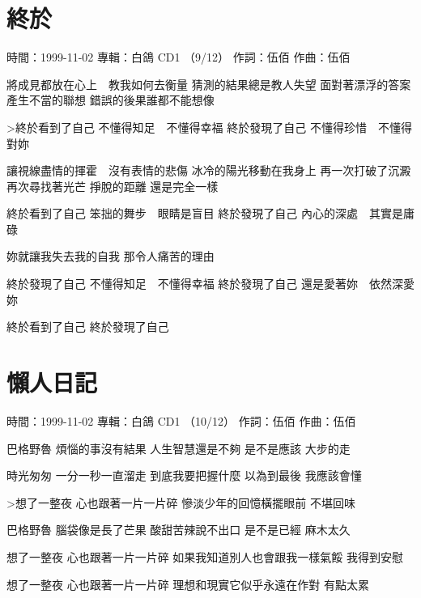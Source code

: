 \documentclass[UTF8,a4paper,oneside,twocolumn,12pt]{ctexbook}
\newcommand{\infopair}[2]{\textbullet #1：#2}
\newcommand{\zc}[1][伍佰]{\infopair{作詞}{#1}}
\newcommand{\zq}[1][伍佰]{\infopair{作曲}{#1}}
\newcommand{\zj}[1]{\infopair{專輯}{#1}}
\newcommand{\sj}[1]{\infopair{時間}{#1}}
\newenvironment{info}{\begin{flushleft}\kaishu
	}
	{\end{flushleft}\normalsize\yahei\par}
\newenvironment{lyric}{
	}
{}
\begin{document}
\section{終於}
\begin{info}
	\sj{1999-11-02}
	\zj{白鴿 CD1 （9/12）}
	\zc
	\zq
\end{info}
\begin{lyric}
	將成見都放在心上　教我如何去衡量
	猜測的結果總是教人失望
	面對著漂浮的答案　產生不當的聯想
	錯誤的後果誰都不能想像

	>終於看到了自己
	不懂得知足　不懂得幸福
	終於發現了自己
	不懂得珍惜　不懂得對妳

	讓視線盡情的揮霍　沒有表情的悲傷
	冰冷的陽光移動在我身上
	再一次打破了沉澱　再次尋找著光芒
	掙脫的距離  還是完全一樣

	終於看到了自己
	笨拙的舞步　眼睛是盲目
	終於發現了自己
	內心的深處　其實是庸碌

	妳就讓我失去我的自我
	那令人痛苦的理由

	終於發現了自己
	不懂得知足　不懂得幸福
	終於發現了自己
	還是愛著妳　依然深愛妳

	終於看到了自己
	終於發現了自己
\end{lyric}

\section{懶人日記}
\begin{info}
	\sj{1999-11-02}
	\zj{白鴿 CD1 （10/12）}
	\zc
	\zq
\end{info}
\begin{lyric}
	巴格野魯 煩惱的事沒有結果 人生智慧還是不夠
	是不是應該 大步的走

	時光匆匆 一分一秒一直溜走 到底我要把握什麼
	以為到最後 我應該會懂

	>想了一整夜 心也跟著一片一片碎
	慘淡少年的回憶橫擺眼前 不堪回味

	巴格野魯 腦袋像是長了芒果 酸甜苦辣說不出口
	是不是已經 麻木太久

	想了一整夜 心也跟著一片一片碎
	如果我知道別人也會跟我一樣氣餒
	我得到安慰

	想了一整夜 心也跟著一片一片碎
	理想和現實它似乎永遠在作對 有點太累
\end{lyric}
\end{document}
